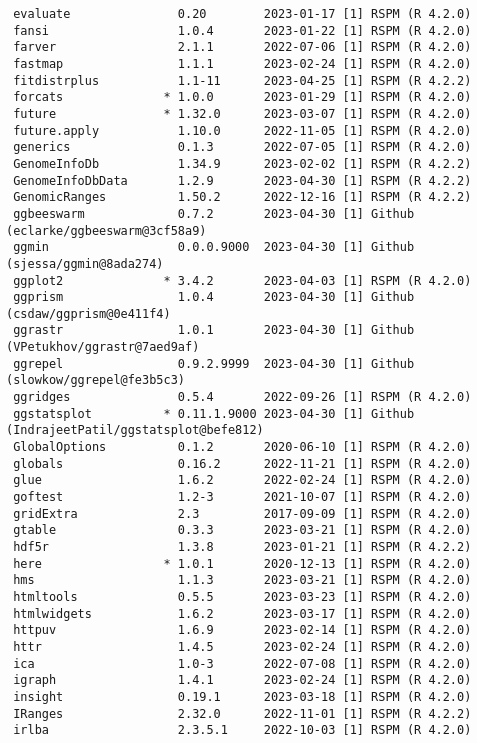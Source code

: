 \documentclass[
  letterpaper,
  DIV=11,
  numbers=noendperiod]{scrartcl}
\begin{document}
\begin{verbatim}
 evaluate               0.20        2023-01-17 [1] RSPM (R 4.2.0)
 fansi                  1.0.4       2023-01-22 [1] RSPM (R 4.2.0)
 farver                 2.1.1       2022-07-06 [1] RSPM (R 4.2.0)
 fastmap                1.1.1       2023-02-24 [1] RSPM (R 4.2.0)
 fitdistrplus           1.1-11      2023-04-25 [1] RSPM (R 4.2.2)
 forcats              * 1.0.0       2023-01-29 [1] RSPM (R 4.2.0)
 future               * 1.32.0      2023-03-07 [1] RSPM (R 4.2.0)
 future.apply           1.10.0      2022-11-05 [1] RSPM (R 4.2.0)
 generics               0.1.3       2022-07-05 [1] RSPM (R 4.2.0)
 GenomeInfoDb           1.34.9      2023-02-02 [1] RSPM (R 4.2.2)
 GenomeInfoDbData       1.2.9       2023-04-30 [1] RSPM (R 4.2.2)
 GenomicRanges          1.50.2      2022-12-16 [1] RSPM (R 4.2.2)
 ggbeeswarm             0.7.2       2023-04-30 [1] Github (eclarke/ggbeeswarm@3cf58a9)
 ggmin                  0.0.0.9000  2023-04-30 [1] Github (sjessa/ggmin@8ada274)
 ggplot2              * 3.4.2       2023-04-03 [1] RSPM (R 4.2.0)
 ggprism                1.0.4       2023-04-30 [1] Github (csdaw/ggprism@0e411f4)
 ggrastr                1.0.1       2023-04-30 [1] Github (VPetukhov/ggrastr@7aed9af)
 ggrepel                0.9.2.9999  2023-04-30 [1] Github (slowkow/ggrepel@fe3b5c3)
 ggridges               0.5.4       2022-09-26 [1] RSPM (R 4.2.0)
 ggstatsplot          * 0.11.1.9000 2023-04-30 [1] Github (IndrajeetPatil/ggstatsplot@befe812)
 GlobalOptions          0.1.2       2020-06-10 [1] RSPM (R 4.2.0)
 globals                0.16.2      2022-11-21 [1] RSPM (R 4.2.0)
 glue                   1.6.2       2022-02-24 [1] RSPM (R 4.2.0)
 goftest                1.2-3       2021-10-07 [1] RSPM (R 4.2.0)
 gridExtra              2.3         2017-09-09 [1] RSPM (R 4.2.0)
 gtable                 0.3.3       2023-03-21 [1] RSPM (R 4.2.0)
 hdf5r                  1.3.8       2023-01-21 [1] RSPM (R 4.2.2)
 here                 * 1.0.1       2020-12-13 [1] RSPM (R 4.2.0)
 hms                    1.1.3       2023-03-21 [1] RSPM (R 4.2.0)
 htmltools              0.5.5       2023-03-23 [1] RSPM (R 4.2.0)
 htmlwidgets            1.6.2       2023-03-17 [1] RSPM (R 4.2.0)
 httpuv                 1.6.9       2023-02-14 [1] RSPM (R 4.2.0)
 httr                   1.4.5       2023-02-24 [1] RSPM (R 4.2.0)
 ica                    1.0-3       2022-07-08 [1] RSPM (R 4.2.0)
 igraph                 1.4.1       2023-02-24 [1] RSPM (R 4.2.0)
 insight                0.19.1      2023-03-18 [1] RSPM (R 4.2.0)
 IRanges                2.32.0      2022-11-01 [1] RSPM (R 4.2.2)
 irlba                  2.3.5.1     2022-10-03 [1] RSPM (R 4.2.0)

\end{verbatim}
\end{document}
